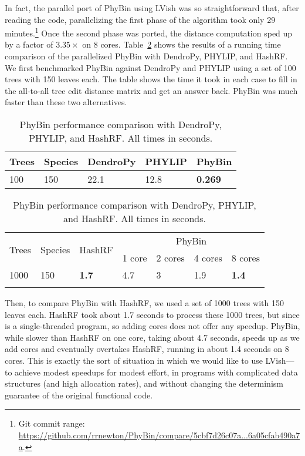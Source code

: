 In fact, the parallel port of PhyBin using LVish was so
straightforward that, after reading the code, parallelizing the first
phase of the algorithm took only 29 minutes.\footnote{Git commit
  range:
  \url{https://github.com/rrnewton/PhyBin/compare/5cbf7d26c07a...6a05cfab490a7a}.}
Once the second phase was ported, the distance computation sped up by
a factor of $3.35\times$ on 8 cores. Table~\ref{t:phybin-bench} shows
the results of a running time comparison of the parallelized PhyBin
with DendroPy, PHYLIP, and HashRF.  We first benchmarked PhyBin
against DendroPy and PHYLIP using a set of 100 trees with 150 leaves
each.  The table shows the time it took in each case to fill in the
all-to-all tree edit distance matrix and get an answer back.  PhyBin
was much faster than these two alternatives.

\begin{table}[h]

\begin{tabularx}{.75\textwidth}{XXXXX}
Trees & Species & DendroPy & PHYLIP & PhyBin    \\ \hline
100   & 150     & 22.1     & 12.8   & \textbf{0.269}
\end{tabularx}

\vspace{8mm}

\begin{tabularx}{\textwidth}{XXXXXXX}
\multirow{2}{*}{Trees} & \multirow{2}{*}{Species} & \multirow{2}{*}{HashRF} & \multicolumn{4}{c}{PhyBin}                \\
                       &                          &                         & 1 core & 2 cores & 4 cores & 8 cores      \\ \hline
1000                   & 150                      & \textbf{1.7}            & 4.7    & 3       & 1.9     & \textbf{1.4} \\
                       &                          &                         &        &         &         &              \\
\end{tabularx}
\caption{PhyBin performance comparison with DendroPy, PHYLIP, and
  HashRF.  All times in seconds.}
\label{t:phybin-bench}
\end{table}

Then, to compare PhyBin with HashRF, we used a set of 1000 trees with
150 leaves each.  HashRF took about 1.7 seconds to process these 1000
trees, but since is a single-threaded program, so adding cores does
not offer any speedup.  PhyBin, while slower than HashRF on one core,
taking about 4.7 seconds, speeds up as we add cores and eventually
overtakes HashRF, running in about 1.4 seconds on 8 cores.  This is
exactly the sort of situation in which we would like to use LVish---to
achieve modest speedups for modest effort, in programs with
complicated data structures (and high allocation rates), and without
changing the determinism guarantee of the original functional code.

